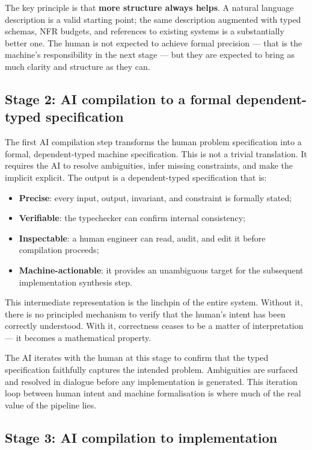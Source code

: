 \documentclass[12pt]{article}
\begin{document}
The key principle is that \textbf{more structure always helps}. A natural
language description is a valid starting point; the same description
augmented with typed schemas, NFR budgets, and references to existing systems
is a substantially better one. The human is not expected to achieve formal
precision --- that is the machine's responsibility in the next stage --- but
they are expected to bring as much clarity and structure as they can.

\subsection{Stage 2: AI compilation to a formal dependent-typed specification}

The first AI compilation step transforms the human problem specification into
a formal, dependent-typed machine specification. This is not a trivial
translation. It requires the AI to resolve ambiguities, infer missing
constraints, and make the implicit explicit. The output is a dependent-typed
specification that is:

\begin{itemize}
  \item \textbf{Precise}: every input, output, invariant, and constraint is
        formally stated;
  \item \textbf{Verifiable}: the typechecker can confirm internal
        consistency;
  \item \textbf{Inspectable}: a human engineer can read, audit, and edit it
        before compilation proceeds;
  \item \textbf{Machine-actionable}: it provides an unambiguous target for
        the subsequent implementation synthesis step.
\end{itemize}

This intermediate representation is the linchpin of the entire system.
Without it, there is no principled mechanism to verify that the human's
intent has been correctly understood. With it, correctness ceases to be a
matter of interpretation --- it becomes a mathematical property.

The AI iterates with the human at this stage to confirm that the typed
specification faithfully captures the intended problem. Ambiguities are
surfaced and resolved in dialogue before any implementation is generated.
This iteration loop between human intent and machine formalisation is where
much of the real value of the pipeline lies.

\subsection{Stage 3: AI compilation to implementation}
\end{document}
